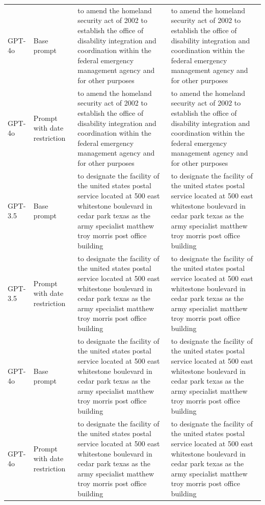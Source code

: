 \begin{longtable}{>{\raggedright\arraybackslash}p{1.4cm}>{\raggedright\arraybackslash}p{1.4cm}>{\raggedright\arraybackslash}p{5.5cm}>{\raggedright\arraybackslash}p{5.5cm}}
GPT-4o & Base prompt & to amend the homeland security act of 2002 to establish the office of disability integration and coordination within the federal emergency management agency and for other purposes & to amend the homeland security act of 2002 to establish the office of disability integration and coordination within the federal emergency management agency and for other purposes\\
GPT-4o & Prompt with date restriction & to amend the homeland security act of 2002 to establish the office of disability integration and coordination within the federal emergency management agency and for other purposes & to amend the homeland security act of 2002 to establish the office of disability integration and coordination within the federal emergency management agency and for other purposes\\
GPT-3.5 & Base prompt & to designate the facility of the united states postal service located at 500 east whitestone boulevard in cedar park texas as the army specialist matthew troy morris post office building & to designate the facility of the united states postal service located at 500 east whitestone boulevard in cedar park texas as the army specialist matthew troy morris post office building\\
GPT-3.5 & Prompt with date restriction & to designate the facility of the united states postal service located at 500 east whitestone boulevard in cedar park texas as the army specialist matthew troy morris post office building & to designate the facility of the united states postal service located at 500 east whitestone boulevard in cedar park texas as the army specialist matthew troy morris post office building\\
GPT-4o & Base prompt & to designate the facility of the united states postal service located at 500 east whitestone boulevard in cedar park texas as the army specialist matthew troy morris post office building & to designate the facility of the united states postal service located at 500 east whitestone boulevard in cedar park texas as the army specialist matthew troy morris post office building\\
GPT-4o & Prompt with date restriction & to designate the facility of the united states postal service located at 500 east whitestone boulevard in cedar park texas as the army specialist matthew troy morris post office building & to designate the facility of the united states postal service located at 500 east whitestone boulevard in cedar park texas as the army specialist matthew troy morris post office building\\

\end{longtable}
